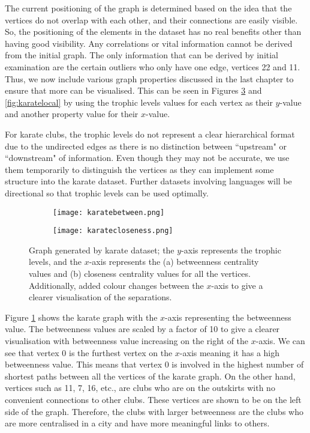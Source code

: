 The current positioning of the graph is determined based on the idea that the vertices do not overlap with each other, and their connections are easily visible. So, the positioning of the elements in the dataset has no real benefits other than having good visibility. Any correlations or vital information cannot be derived from the initial graph. The only information that can be derived by initial examination are the certain outliers who only have one edge, vertices 22 and 11. Thus, we now include various graph properties discussed in the last chapter to ensure that more can be visualised. This can be seen in Figures \ref{fig:karatecentrality} and \ref{fig:karatelocal} by using the trophic levels values for each vertex as their $y$-value and another property value for their $x$-value.

For karate clubs, the trophic levels do not represent a clear hierarchical format due to the undirected edges as there is no distinction between ``upstream" or ``downstream" of information. Even though they may not be accurate, we use them temporarily to distinguish the vertices as they can implement some structure into the karate dataset. Further datasets involving languages will be directional so that trophic levels can be used optimally.

\begin{figure}[!htb]
\centering
\begin{subfigure}{.45\textwidth}
	\hspace{-2cm}
	\texttt{[image: karatebetween.png]}
	\caption{}
	\label{fig:karatea}
\end{subfigure}
\begin{subfigure}{.45\textwidth}
	\texttt{[image: karatecloseness.png]}
	\caption{}
	\label{fig:karateb}
\end{subfigure}
\caption{Graph generated by karate dataset; the $y$-axis represents the trophic levels, and the $x$-axis represents the (a) betweenness centrality values and (b) closeness centrality values for all the vertices. Additionally, added colour changes between the $x$-axis to give a clearer visualisation of the separations.}
\label{fig:karatecentrality}
\end{figure}

Figure \ref{fig:karatea} shows the karate graph with the $x$-axis representing the betweenness value. The betweenness values are scaled by a factor of 10 to give a clearer visualisation with betweenness value increasing on the right of the $x$-axis. We can see that vertex 0 is the furthest vertex on the $x$-axis meaning it has a high betweenness value. This means that vertex 0 is involved in the highest number of shortest paths between all the vertices of the karate graph. On the other hand, vertices such as 11, 7, 16, etc., are clubs who are on the outskirts with no convenient connections to other clubs. These vertices are shown to be on the left side of the graph. Therefore, the clubs with larger betweenness are the clubs who are more centralised in a city and have more meaningful links to others.

